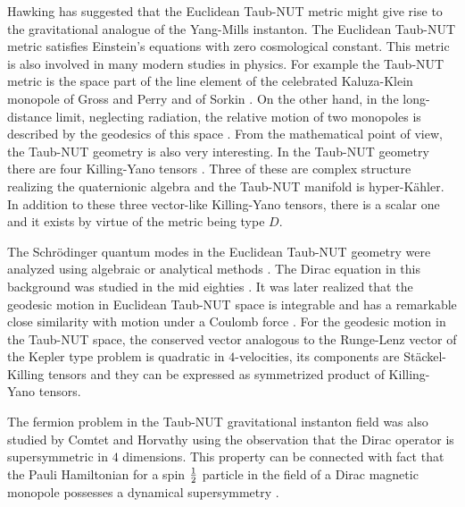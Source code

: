 \documentclass[a4paper,12pt]{article}
\begin{document}
Hawking \cite{Ha} has suggested that the Euclidean Taub-NUT metric 
might give rise to the gravitational analogue of the Yang-Mills 
instanton. The Euclidean Taub-NUT metric satisfies Einstein's equations 
with zero cosmological constant. 
This  metric  is also involved in many modern studies in physics.
For example the Taub-NUT metric is the space part of the line element 
of the celebrated Kaluza-Klein monopole of Gross and Perry \cite{GP} and 
of Sorkin \cite{So}. On the other hand, in the 
long-distance limit, neglecting radiation, the relative motion of two 
monopoles is described by the geodesics of this space \cite{G1}.
From the mathematical point of view, the Taub-NUT geometry is also very 
interesting. In the Taub-NUT geometry there are four Killing-Yano tensors 
\cite{GR}. Three of these are complex structure realizing the quaternionic 
algebra and the Taub-NUT manifold is hyper-K\" ahler. In addition to these 
three vector-like Killing-Yano tensors, there is a scalar one and it 
exists by virtue of the metric being type $D$.

The Schr\" odinger quantum modes in the Euclidean Taub-NUT geometry were 
analyzed  using algebraic \cite{G2} or analytical methods \cite{CV}.
The Dirac equation in this background was studied in the mid eighties 
\cite{DIRAC}. It was later realized that the geodesic motion in 
Euclidean Taub-NUT space is integrable and has a remarkable close 
similarity with motion under a Coulomb force \cite{GR,G2}. For the 
geodesic motion in the Taub-NUT space, the conserved vector analogous 
to the Runge-Lenz vector of the Kepler type problem is quadratic in 
$4$-velocities, its components are St\" ackel-Killing tensors and they 
can be expressed as symmetrized product of Killing-Yano tensors.

The fermion problem in the Taub-NUT gravitational instanton field was 
also studied by Comtet and Horvathy \cite{CH} using the observation 
that the Dirac operator is supersymmetric in $4$ dimensions. This 
property can be connected with fact that the Pauli Hamiltonian for a 
spin $1\over 2$ particle in the field of a Dirac magnetic monopole 
possesses a dynamical supersymmetry \cite{DYON}. 
\end{document}
